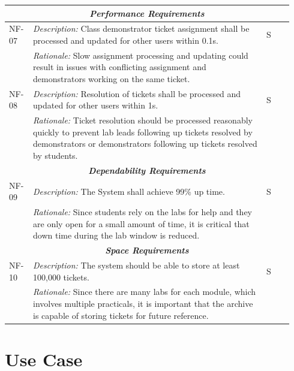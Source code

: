 \begin{table}[H]
\begin{tabular}{|p{0.07\linewidth} | p{0.78\linewidth} |p{0.09\linewidth}|}
    \multicolumn{3}{c}{\textit{\textbf{Performance Requirements}}}\\
    
  \hline
   NF-07 & \textit{Description:} Class demonstrator ticket assignment shall be processed and updated for other users within 0.1s. & S \\
  \cline{2-2}
  & \textit{Rationale:} Slow assignment processing and updating could result in issues with conflicting assignment and demonstrators working on the same ticket. & \\
 
   \hline\hline
   NF-08 & \textit{Description:} Resolution of tickets shall be processed and updated for other users within 1s. & S \\
  \cline{2-2}
  & \textit{Rationale:} Ticket resolution should be processed reasonably quickly to prevent lab leads following up tickets resolved by demonstrators or demonstrators following up tickets resolved by students. & \\
  \hline
  
      \multicolumn{3}{c}{\textit{\textbf{Dependability Requirements}}}\\
  
   \hline
   NF-09 & \textit{Description:} The System shall achieve 99\% up time. & S \\
  \cline{2-2}
  & \textit{Rationale:} Since students rely on the labs for help and they are only open for a small amount of time, it is critical that down time during the lab window is reduced. & \\
\hline
   
\multicolumn{3}{c}{\textit{\textbf{Space Requirements}}}\\
   
   \hline
   NF-10 & \textit{Description:} The system should be able to store at least 100,000 tickets. & S \\
    \cline{2-2}
  & \textit{Rationale:} Since there are many labs for each module, which involves multiple practicals, it is important that the archive is capable of storing tickets for future reference. & \\
 \hline

\end{tabular}
\end{table}

\newpage
\section{Use Case}


